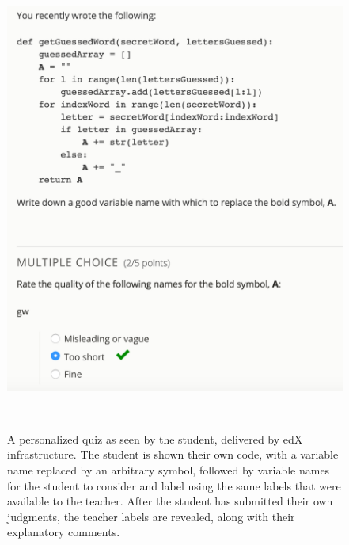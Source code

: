 \begin{figure}
\centering
\includegraphics[width=0.95\columnwidth]{Body/figures/foobaz/feedbackQuizExample.png}
\caption{A personalized quiz as seen by the student, delivered by edX infrastructure. The student is shown their own code, with a variable name replaced by an arbitrary symbol, followed by variable names for the student to consider and label using the same labels that were available to the teacher. After the student has submitted their own judgments, the teacher labels are revealed, along with their explanatory comments.}~\label{fig:figure4}
\end{figure}


